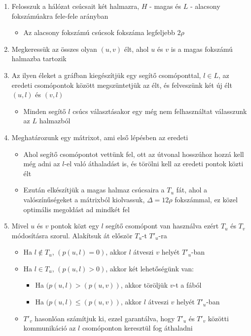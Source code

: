 \documentclass[12pt]{report}
\begin{document}
\begin{enumerate}
	\item Felosszuk a hálózat csúcsait két halmazra, \(H\) - magas és \(L\) - alacsony fokszámúakra fele-fele arányban
	\begin{itemize}
		\item Az alacsony fokszámú csúcsok fokszáma legfeljebb \(2\rho\)
	\end{itemize}
	\item Megkeressük az összes olyan \((u, v)\) élt, ahol \(u\) és \(v\) is a magas fokszámú halmazba tartozik
	\item Az ilyen éleket a gráfban kiegészítjük egy segítő csomóponttal, \(l \in L\), az eredeti csomópontok között megszüntetjük az élt, és felveszünk két új élt \((u, l)\) és \((v, l)\)
	\begin{itemize}
		\item Minden segítő \(l\) csúcs választásakor egy még nem felhasználtat válasszunk az \(L\) halmazból
	\end{itemize}
	\item Meghatározunk egy mátrixot, ami első lépésben az eredeti
	\begin{itemize}
		\item Ahol segítő csomópontot vettünk fel, ott az útvonal hosszúhoz hozzá kell még adni az \(l\)-el való áthaladást is, és törölni kell az eredeti pontok közti élt
		\item Ezután elkészítjük a magas halmaz csúcsaira a \(T_u\) fát, ahol a valószínűségeket a mátrixból kiolvassuk, \(\Delta = 12\rho\) fokszámmal, ez közel optimális megoldást ad mindkét fel
	\end{itemize}
	\item Mivel \(u\) és \(v\) pontok közt egy \(l\) segítő csomópont van használva ezért \(T_u\) és \(T_v\) módosításra szorul. Alakítsuk át először \(T_u\)-t \(T'_u\)-ra
	\begin{itemize}
		\item Ha \(l \notin T_u\), \((p(u, l) = 0)\), akkor \(l\) átveszi \(v\) helyét \(T'_u\)-ban
		\item Ha \(l \in T_u\), \((p(u, l) > 0)\), akkor két lehetőségünk van:
		\begin{itemize}
			\item Ha \((p(u, l) > (p(u, v))\), akkor töröljük \(v\)-t a fából
			\item Ha \((p(u, l) \le (p(u, v))\), akkor \(l\) átveszi \(v\) helyét \(T'_u\)-ban
		\end{itemize}
		\item \(T'_v\) hasonlóan számítjuk ki, ezzel garantálva, hogy \(T'_u\) és \(T'_v\) közötti kommunikáció az \(l\) csomóponton keresztül fog áthaladni

\end{itemize}
\end{enumerate}
\end{document}
